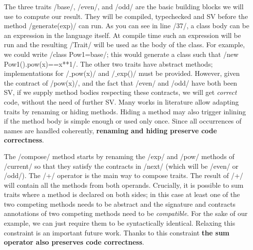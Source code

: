 The three traits /base/, /even/, and /odd/ are the basic building blocks we will use to compute our result. They will be compiled, typechecked and SV before the method /generate(exp)/ can run.
As you can see in line /37/, a class body can be an expression in the language itself.
At compile time such an expression will be run and the resulting /Trait/ will be used as the body of the class.
For example, we could write /class Pow1=base/; this would generate a class such that /new Pow1().pow(x)==x**1/.
The other two traits have abstract methods; implementations for /$\_$pow(x)/ and /$\_$exp()/ must be provided. However, given the contract of /pow(x)/,
and the fact that /even/ and /odd/ have both been SV,
if we supply method bodies respecting these contracts, we will get \emph{correct} code, without the need of further SV. 
Many works in literature allow adapting traits by renaming or hiding methods\cite{servetto2014meta,reppy2007metaprogramming,liquori2008feathertrait}. Hiding a method may also trigger inlining if the method body is simple enough or used only once.
Since all occurrences of names are handled coherently, \textbf{renaming and hiding preserve code correctness}.  

The /compose/ method starts by renaming the /exp/ and /pow/ methods of /current/
so that they satisfy the contracts in /next/ (which will be 
/even/ or /odd/).
The /+/ operator is the main way to compose traits.
The result of /+/ will contain all the methods from both operands.
Crucially, it is possible to sum traits where a method is declared on both sides; in this case at least one of the two competing methods needs to be abstract and the signature and contracts annotations of two competing methods need to be \emph{compatible}.
For the sake of our example, we can just require them to be syntactically identical. Relaxing this constraint is an important future work. 
Thanks to this constraint \textbf{the sum operator also preserves code correctness}.

